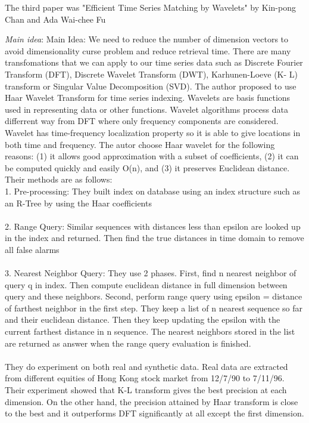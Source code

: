 The third paper was "Efficient Time Series Matching by Wavelets" by Kin-pong Chan and Ada Wai-chee Fu
\begin{itemize*}
\item {\em Main idea}:
Main Idea: We need to reduce the number of dimension vectors to avoid dimensionality curse problem and reduce retrieval time. There are many transfomations that we can apply to our time series data such as Discrete Fourier Transform (DFT), Discrete Wavelet Transform (DWT), Karhunen-Loeve (K- L) transform or Singular Value Decomposition (SVD). The author proposed to use Haar Wavelet Transform for time series indexing. Wavelets are basis functions used in representing data or other functions. Wavelet algorithms process data differrent way from DFT where only frequency components are considered. Wavelet has time-frequency localization property so it is able to give locations in both time and frequency. The autor choose Haar wavelet for the following reasons: (1) it allows good approximation with a subset of coefficients, (2) it can be computed quickly and easily O(n), and (3) it preserves Euclidean distance. Their methods are as follows: 
\\
1. Pre-processing: They built index on database using an index structure such as an R-Tree by using the Haar coefficients \\\\
2. Range Query: Similar sequences with distances less than epsilon are looked up in the index and returned. Then find the true distances in time domain to remove all false alarms \\\\
3. Nearest Neighbor Query: They use 2 phases. First, find n nearest neighbor of query q in index. Then compute euclidean distance in full dimension between query and these neighbors. Second, perform range query using epsilon = distance of farthest neighbor in the first step. They keep a list of n nearest sequence so far and their euclidean distance. Then they keep updating the epsilon with the current farthest distance in n sequence. The nearest neighbors stored in the list are returned as answer when the range query evaluation is finished.\\\\
They do experiment on both real and synthetic data. Real data are extracted from different equities of Hong Kong stock market from 12/7/90 to 7/11/96. Their experiment showed that K-L transform gives the best precision at each dimension. On the other hand, the precision attained by Haar transform is close to the best and it outperforms DFT significantly at all except the first dimension.


\end{itemize*}
